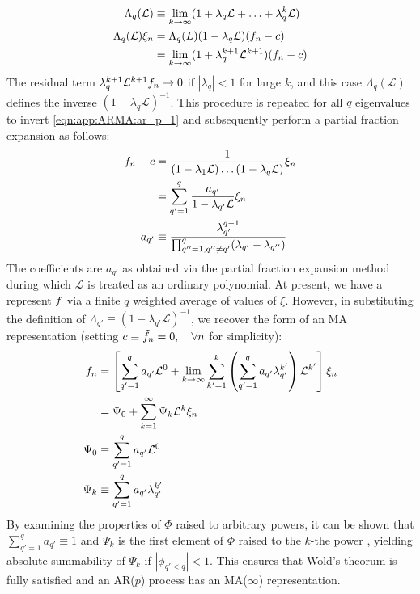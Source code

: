 \begin{align}
\Lambda_q(\mathcal{L}) & \equiv \lim_{k\to \infty} (1 + \lambda_q \mathcal{L} + \hdots + \lambda_q^k\mathcal{L})\\
\Lambda_q(\mathcal{L}) \xi_n & = \Lambda_q(L) (1 - \lambda_q \mathcal{L}) (f_n - c) \\
 & = \lim_{k\to \infty}(1 + \lambda_q^{k+1}\mathcal{L}^{k+1})(f_n - c)
\end{align}
The residual term $\lambda_q^{k+1}\mathcal{L}^{k+1}f_n \to 0 $ if $|\lambda_q| < 1$  for large $k$, and this case $\Lambda_q(\mathcal{L})$ defines the inverse $(1 - \lambda_q \mathcal{L})^{-1}$. This procedure is repeated for all $q$ eigenvalues to invert \cref{eqn:app:ARMA:ar_p_1} and subsequently perform a partial fraction expansion as follows:
\begin{align}
f_n - c & = \frac{1}{(1 - \lambda_1 \mathcal{L}) \hdots (1 - \lambda_q \mathcal{L})} \xi_n\\
& = \sum_{q'=1}^{q}\frac{a_{q'}}{1- \lambda_{q'} \mathcal{L}} \xi_n \\
a_{q'} & \equiv \frac{\lambda_{q'}^{q-1}}{\prod_{q''=1, q''\neq q'}^{q} (\lambda_{q'} - \lambda_{q''})}
\end{align} The coefficients are $a_{q'}$ as obtained via the partial fraction expansion method during which $\mathcal{L}$ is treated as an ordinary polynomial. At present, we have a represent $f$ via a finite $q$ weighted average of values of $\xi$. However, in substituting the definition of $ \Lambda_{q'} \equiv (1- \lambda_{q'} \mathcal{L})^{-1}$, we recover the form of an MA representation (setting $c \equiv \tilde{f}_n  = 0, \quad  \forall n$ for simplicity): 
\begin{align}
f_n & = \left[ \sum_{q'=1}^{q} a_{q'} \mathcal{L}^0 +  \lim_{k \to \infty}  \sum_{k'=1}^{k} \left( \sum_{q'=1}^{q} a_{q'}  \lambda_{q'}^{k'} \right) \mathcal{L}^{k'}\right] \xi_n \\
& = \Psi_0 + \sum_{k=1}^{\infty} \Psi_k \mathcal{L}^k \xi_{n}  \\
\Psi_0 & \equiv \sum_{q'=1}^{q} a_{q'} \mathcal{L}^0  \\
\Psi_k & \equiv \sum_{q'=1}^{q} a_{q'}  \lambda_{q'}^{k'}
\end{align}
By examining the properties of $\Phi$ raised to arbitrary powers, it can be shown that $\sum_{q'=1}^{q} a_{q'} \equiv 1$ and $\Psi_k$ is the first element of $\Phi$ raised to the $k$-the power \cite{hamilton1994time}, yielding absolute summability of $\Psi_k$ if $|\phi_{q'<q}| < 1$. This ensures that Wold's theorum is fully satisfied and an AR($p$) process has an MA($\infty$) representation. 


